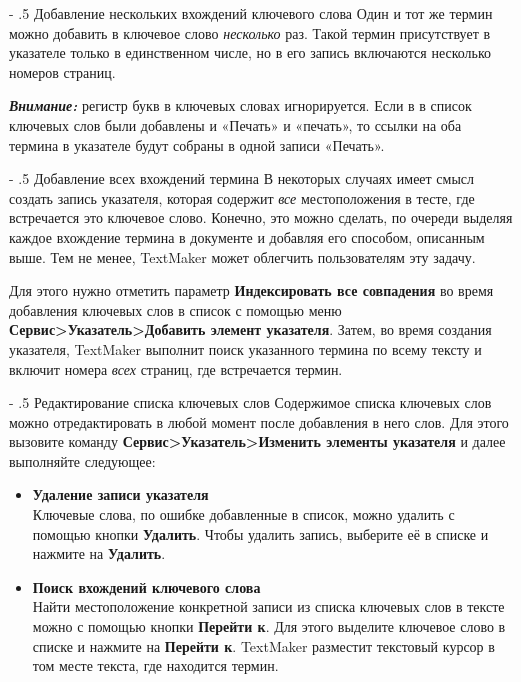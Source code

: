 ﻿\documentclass[a4paper,10pt]{article}
\makeatletter
\renewcommand\paragraph{%
   \@startsection{paragraph}{4}{0mm}%
      {-\baselineskip}%
      {.5\baselineskip}%
      {\normalfont\normalsize\bfseries}}
\makeatother
\begin{document}
\paragraph{Добавление нескольких вхождений ключевого слова}
Один и тот же термин можно добавить в ключевое слово \textit{несколько} раз. Такой термин присутствует в указателе только в единственном числе, но в его запись включаются несколько номеров страниц. 

\begin{mdframed}[backgroundcolor=blue!10]
\textbf{\textit{Внимание:}} регистр букв в ключевых словах игнорируется. Если в в список ключевых слов были добавлены и «Печать» и «печать», то ссылки на оба термина в указателе будут собраны в одной записи «Печать».
\end{mdframed}

\paragraph{Добавление всех вхождений термина}
В некоторых случаях имеет смысл создать запись указателя, которая содержит \textit{все} местоположения в тесте, где встречается это ключевое слово. Конечно, это можно сделать, по очереди выделяя каждое вхождение термина в документе и добавляя его способом, описанным выше. Тем не менее, TextMaker может облегчить пользователям эту задачу.

Для этого нужно отметить параметр \textbf{Индексировать все совпадения} во время добавления ключевых слов в список с помощью меню \textbf{Сервис>Указатель>Добавить элемент указателя}. Затем, во время создания указателя, TextMaker выполнит поиск указанного термина по всему тексту и включит номера \textit{всех} страниц, где встречается термин.

\paragraph{Редактирование списка ключевых слов}
Содержимое списка ключевых слов можно отредактировать в любой момент после добавления в него слов. Для этого вызовите команду \textbf{Сервис>Указатель>Изменить элементы указателя} и далее выполняйте следующее:

\begin{itemize}
 \item \textbf{Удаление записи указателя}\\
 Ключевые слова, по ошибке добавленные в список, можно удалить с помощью кнопки \textbf{Удалить}. Чтобы удалить запись, выберите её в списке и нажмите на \textbf{Удалить}.
 \item \textbf{Поиск вхождений ключевого слова}\\
 Найти местоположение конкретной записи из списка ключевых слов в тексте можно с помощью кнопки \textbf{Перейти к}. Для этого выделите ключевое слово в списке и нажмите на \textbf{Перейти к}. TextMaker разместит текстовый курсор в том месте текста, где находится термин.
\end{itemize}
\end{document}
